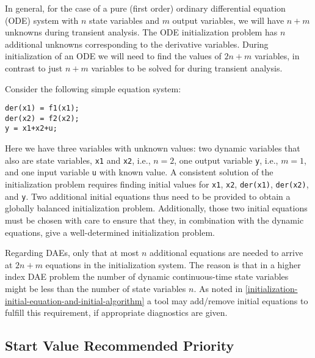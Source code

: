 \begin{nonnormative}
In general, for the case of a pure (first order) ordinary differential equation (ODE) system with $n$ state variables and $m$ output variables, we will have $n+m$ unknowns during transient analysis.
The ODE initialization problem has $n$ additional unknowns corresponding to the derivative variables.
During initialization of an ODE we will need to find the values of $2n+m$ variables, in contrast to just $n+m$ variables to be solved for during transient analysis.
\end{nonnormative}

\begin{example}
Consider the following simple equation system:
\begin{lstlisting}[language=modelica]
der(x1) = f1(x1);
der(x2) = f2(x2);
y = x1+x2+u;
\end{lstlisting}

Here we have three variables with unknown values: two dynamic variables that also are state variables, \lstinline!x1! and \lstinline!x2!, i.e., $n=2$, one output variable \lstinline!y!, i.e., $m=1$, and one input variable \lstinline!u! with known value.
A consistent solution of the initialization problem requires finding initial values for \lstinline!x1!, \lstinline!x2!, \lstinline!der(x1)!, \lstinline!der(x2)!, and \lstinline!y!.
Two additional initial equations thus need to be provided to obtain a globally balanced initialization problem.
Additionally, those two initial equations must be chosen with care to ensure that they, in combination with the dynamic equations, give a well-determined initialization problem.

Regarding DAEs, only that at most $n$ additional equations are needed to arrive at $2n+m$ equations in the initialization system.
The reason is that in a higher index DAE problem the number of dynamic continuous-time state variables might be less than the number of state variables $n$.
As noted in \cref{initialization-initial-equation-and-initial-algorithm} a tool may add/remove initial equations to fulfill this requirement, if appropriate diagnostics are given.
\end{example}

\subsection{Start Value Recommended Priority}\label{recommended-selection-of-start-values}\label{start-value-recommended-priority}

